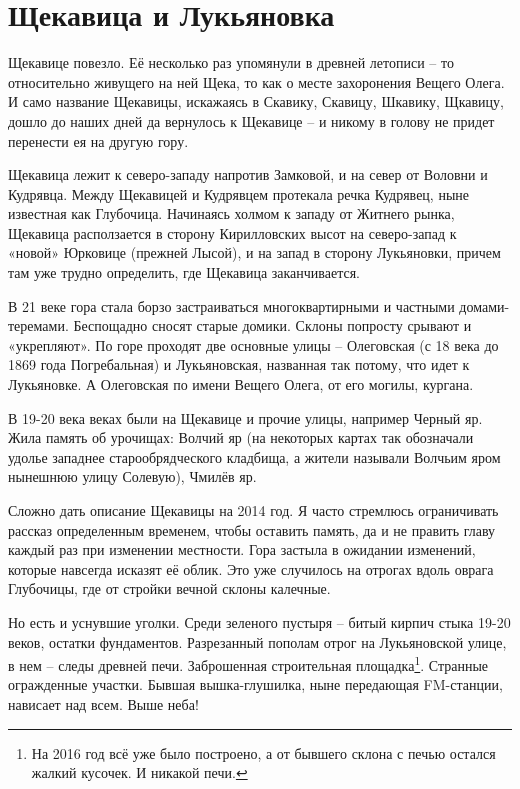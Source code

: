\chapter{Щекавица и Лукьяновка}

Щекавице повезло. Её несколько раз упомянули в древней летописи – то относительно живущего на ней Щека, то как о месте захоронения Вещего Олега. И само название Щекавицы, искажаясь в Скавику, Скавицу, Шкавику, Щкавицу, дошло до наших дней да вернулось к Щекавице – и никому в голову не придет перенести ея на другую гору.

Щекавица лежит к северо-западу напротив Замковой, и на север от Воловни и Кудрявца. Между Щекавицей и Кудрявцем протекала речка Кудрявец, ныне известная как Глубочица. Начинаясь холмом к западу от Житнего рынка, Щекавица расползается в сторону Кирилловских высот на северо-запад к «новой» Юрковице (прежней Лысой), и на запад в сторону Лукьяновки, причем там уже трудно определить, где Щекавица заканчивается.

В 21 веке гора стала борзо застраиваться многоквартирными и частными домами-теремами. Беспощадно сносят старые домики. Склоны попросту срывают и «ук\-репляют». По горе проходят две основные улицы – Олеговская (с 18 века до 1869 года Погребальная) и Лукьяновская, названная так потому, что идет к Лукьяновке. А Олеговская по имени Вещего Олега, от его могилы, кургана.

В 19-20 века веках были на Щекавице и прочие улицы, например Черный яр. Жила память об урочищах: Волчий яр (на некоторых картах так обозначали удолье западнее старообрядческого кладбища, а жители называли Волчьим яром нынешнюю улицу Солевую), Чмилёв яр.

Сложно дать описание Щекавицы на 2014 год. Я часто стремлюсь ограничивать рассказ определенным временем, чтобы оставить память, да и не править главу каждый раз при изменении местности. Гора застыла в ожидании изменений, которые навсегда исказят её облик. Это уже случилось на отрогах вдоль оврага Глубочицы, где от стройки вечной склоны калечные.

Но есть и уснувшие уголки. Среди зеленого пустыря – битый кирпич стыка 19-20 веков, остатки фундаментов. Разрезанный пополам отрог на Лукьяновской улице, в нем – следы древней печи. Заброшенная строительная площадка\footnote{На 2016 год всё уже было построено, а от бывшего склона с печью остался жалкий кусочек. И никакой печи.}. Странные огражденные участки. Бывшая вышка-глушилка, ныне передающая FM-станции, нависает над всем. Выше неба!


